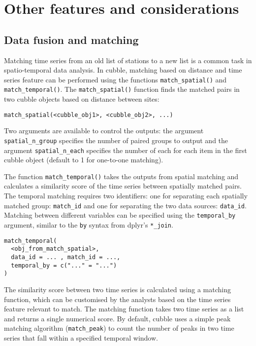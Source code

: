 \documentclass[
  shortnames]{jss}
\begin{document}
\hypertarget{others}{%
\section{Other features and considerations}\label{others}}

\hypertarget{matching}{%
\subsection{Data fusion and matching}\label{matching}}

Matching time series from an old list of stations to a new list is a common task in spatio-temporal data analysis. In cubble, matching based on distance and time series feature can be performed using the functions \texttt{match\_spatial()} and \texttt{match\_temporal()}. The \texttt{match\_spatial()} function finds the matched pairs in two cubble objects based on distance between sites:

\begin{verbatim}
match_spatial(<cubble_obj1>, <cubble_obj2>, ...)
\end{verbatim}

Two arguments are available to control the outputs: the argument \texttt{spatial\_n\_group} specifies the number of paired groups to output and the argument \texttt{spatial\_n\_each} specifies the number of each for each item in the first cubble object (default to 1 for one-to-one matching).

The function \texttt{match\_temporal()} takes the outputs from spatial matching and calculates a similarity score of the time series between spatially matched pairs. The temporal matching requires two identifiers: one for separating each spatially matched group: \texttt{match\_id} and one for separating the two data sources: \texttt{data\_id}. Matching between different variables can be specified using the \texttt{temporal\_by} argument, similar to the \texttt{by} syntax from dplyr's \texttt{*\_join}.

\begin{verbatim}
match_temporal(
  <obj_from_match_spatial>, 
  data_id = ... , match_id = ..., 
  temporal_by = c("..." = "...")
)
\end{verbatim}

The similarity score between two time series is calculated using a matching function, which can be customised by the analysts based on the time series feature relevant to match. The matching function takes two time series as a list and returns a single numerical score. By default, cubble uses a simple peak matching algorithm (\texttt{match\_peak}) to count the number of peaks in two time series that fall within a specified temporal window.
\end{document}
